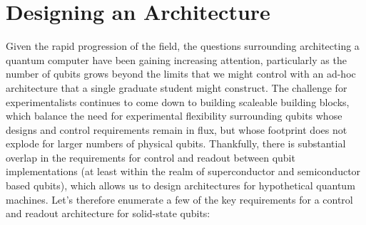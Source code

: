\section{Designing an Architecture}
\label{sec:archdesign}
Given the rapid progression of the field, the questions surrounding architecting a quantum computer have been gaining increasing attention,
particularly as the number of qubits grows beyond the limits that we might control with an ad-hoc architecture that a single graduate student might construct.
The challenge for experimentalists continues to come down to building scaleable building blocks, which balance the need for experimental
flexibility surrounding qubits whose designs and control requirements remain in flux, but whose footprint does not explode for larger numbers
of physical qubits. Thankfully, there is substantial overlap in the requirements for control and readout between qubit implementations
(at least within the realm of superconductor and semiconductor based qubits), which allows us to design architectures for hypothetical
quantum machines. Let's therefore enumerate a few of the key requirements for a control and readout architecture for solid-state qubits:
